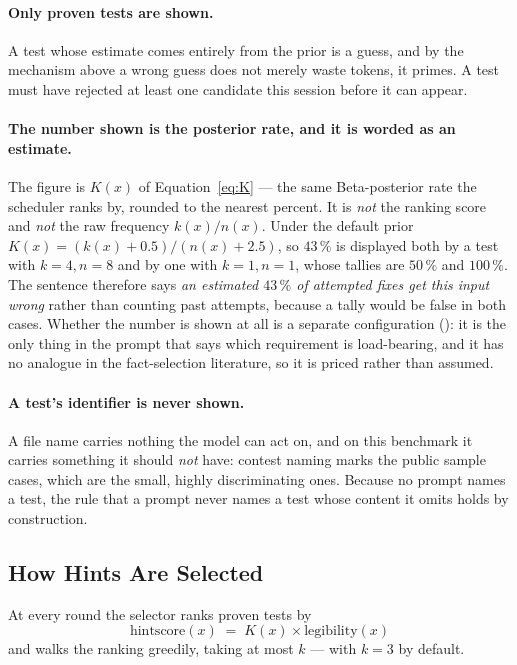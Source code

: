\paragraph{Only proven tests are shown.} A test whose estimate comes entirely
from the prior is a guess, and by the mechanism above a wrong guess does not
merely waste tokens, it primes. A test must have rejected at least one
candidate this session before it can appear.

\paragraph{The number shown is the posterior rate, and it is worded as an
estimate.} The figure is $K(x)$ of Equation~\eqref{eq:K} --- the same
Beta-posterior rate the scheduler ranks by, rounded to the nearest percent. It
is \emph{not} the ranking score and \emph{not} the raw frequency $k(x)/n(x)$.
Under the default prior $K(x) = (k(x)+0.5)/(n(x)+2.5)$, so $43\,\%$ is
displayed both by a test with $k{=}4, n{=}8$ and by one with $k{=}1, n{=}1$,
whose tallies are $50\,\%$ and $100\,\%$. The sentence therefore says
\emph{an estimated $43\,\%$ of attempted fixes get this input wrong} rather
than counting past attempts, because a tally would be false in both cases.
Whether the number is shown at all is a separate configuration
(): it is the only thing in the prompt that says which
requirement is load-bearing, and it has no analogue in the fact-selection
literature, so it is priced rather than assumed.

\paragraph{A test's identifier is never shown.} A file name carries nothing
the model can act on, and on this benchmark it carries something it should
\emph{not} have: contest naming marks the public sample cases, which are the
small, highly discriminating ones. Because no prompt names a test, the rule
that a prompt never names a test whose content it omits holds by
construction.

\subsection{How Hints Are Selected}

At every round the selector ranks proven tests by
\begin{equation}
\mathrm{hintscore}(x) \;=\; K(x) \times \mathrm{legibility}(x)
\label{eq:hintscore}
\end{equation}
and walks the ranking greedily, taking at most $k$ --- with $k = 3$ by
default.

